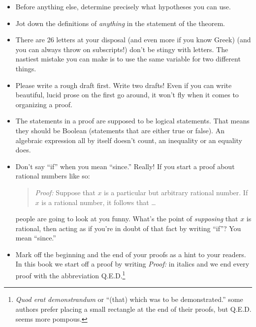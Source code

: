 \begin{itemize}
\item Before anything else, determine precisely what hypotheses you
can use.
\item Jot down the definitions of {\em anything} in the statement of 
the theorem.
\item There are 26 letters at your disposal (and even more if you know
Greek) (and you can always throw on subscripts!) don't be stingy with
letters.  The nastiest mistake you can make is to use the same variable
for two different things.
\item Please write a rough draft first.  Write two drafts!  Even if you
can write beautiful, lucid prose on the first go around, it won't fly
when it comes to organizing a proof.
\item The statements in a proof are supposed to be logical statements.
That means they should be Boolean (statements that are either true or false).
An algebraic expression all by itself doesn't count, an inequality or an 
equality does.  
\item Don't say ``if'' when you mean ``since.''  Really!  If you start a
proof about rational numbers like so:

\begin{quote}
{\em Proof:} Suppose that $x$ is a particular but arbitrary rational number.
If $x$ is a rational number, it follows that \ldots
\end{quote}

\noindent people are going to look at you funny.  What's the point of 
{\em supposing}
that $x$ is rational, then acting as if you're in doubt of that fact by
writing ``if''?   You mean ``since.''
\item Mark off the beginning and the end of your proofs as a hint to your
readers.  In this book we start off a proof by writing {\em Proof:} in 
italics and we end every proof with the abbreviation 
Q.E.D.\footnote{{\em Quod erat demonstrandum} or ``(that) which was to 
be demonstrated.'' some authors prefer placing a small rectangle at 
the end of their proofs, but Q.E.D. seems more pompous.}
\end{itemize}

\newpage

